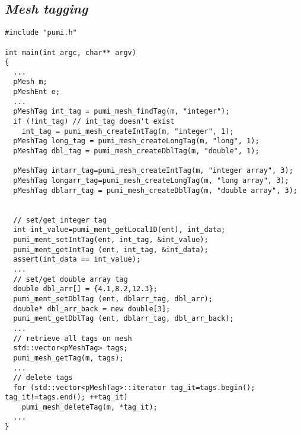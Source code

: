 \subsection{\textit{Mesh tagging}}
\begin{small}
\begin{verbatim}
#include "pumi.h"

int main(int argc, char** argv)
{
  ...
  pMesh m;
  pMeshEnt e;
  ...
  pMeshTag int_tag = pumi_mesh_findTag(m, "integer");
  if (!int_tag) // int_tag doesn't exist
    int_tag = pumi_mesh_createIntTag(m, "integer", 1);
  pMeshTag long_tag = pumi_mesh_createLongTag(m, "long", 1);
  pMeshTag dbl_tag = pumi_mesh_createDblTag(m, "double", 1);

  pMeshTag intarr_tag=pumi_mesh_createIntTag(m, "integer array", 3);
  pMeshTag longarr_tag=pumi_mesh_createLongTag(m, "long array", 3);
  pMeshTag dblarr_tag = pumi_mesh_createDblTag(m, "double array", 3);


  // set/get integer tag
  int int_value=pumi_ment_getLocalID(ent), int_data;
  pumi_ment_setIntTag(ent, int_tag, &int_value);
  pumi_ment_getIntTag (ent, int_tag, &int_data);
  assert(int_data == int_value);
  ...
  // set/get double array tag
  double dbl_arr[] = {4.1,8.2,12.3};
  pumi_ment_setDblTag (ent, dblarr_tag, dbl_arr);
  double* dbl_arr_back = new double[3];
  pumi_ment_getDblTag (ent, dblarr_tag, dbl_arr_back);
  ...
  // retrieve all tags on mesh
  std::vector<pMeshTag> tags;
  pumi_mesh_getTag(m, tags);
  ...
  // delete tags
  for (std::vector<pMeshTag>::iterator tag_it=tags.begin(); tag_it!=tags.end(); ++tag_it)
    pumi_mesh_deleteTag(m, *tag_it);
  ...
}\end{verbatim}
\end{small}

